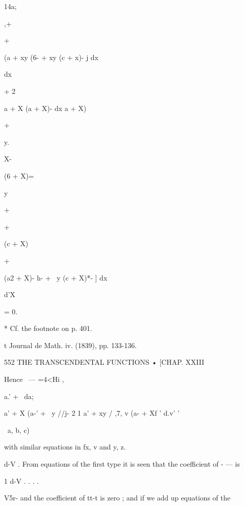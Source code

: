 {{{14a; 



,+ 



+ 



(a  + xy (6- + xy (c  + x)- j dx 



dx 



+ 2 



a  + X (a  + X)- dx   a  + X) 



+ 



y. 



X- 



(6  + X)= 

y 



+ 



+ 



(c  + X)  



+ 



(a2 + X)-  h- + \ y (c  + X)*- ] dx 



d'X 



= 0. 



* Cf. the footnote on p. 401. 

t Journal de Math. iv. (1839), pp. 133-136. 



552 THE TRANSCENDENTAL FUNCTIONS • [CHAP. XXIII 

Hence  ~— =4<Hi , 

a.' + \ da; 

a' + X (a-' + \ y //j- 2 1   a' + xy  / ,7,  v (a- + Xf ' d.v' ' 

\ a, b, c) 

with similar equations in fx, v and y, z. 

d-V . 
From equations of the first type it is seen that the coefficient of - — is 

1 d-V . . . . 

V5r- and the coefficient of tt-t  is zero ; and if we add up equations of the 

}}}
